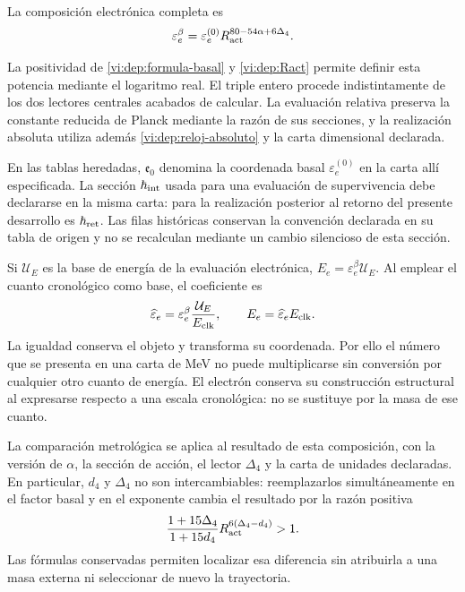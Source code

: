 \begin{definition}
La composición electrónica completa es
\begin{equation}
 \varepsilon_e^\beta
  =\varepsilon_e^{(0)}
      R_{\rm act}^{80-54\alpha+6\Delta_4}.
 \label{vi:dep:electron-beta}
\end{equation}
\end{definition}
La positividad de \eqref{vi:dep:formula-basal} y
\eqref{vi:dep:Ract} permite definir esta potencia mediante el
logaritmo real. El triple entero procede indistintamente de los dos
lectores centrales acabados de calcular. La evaluación relativa
preserva la constante reducida de Planck mediante la razón de sus
secciones, y la realización absoluta utiliza además
\eqref{vi:dep:reloj-absoluto} y la carta dimensional declarada.

En las tablas heredadas, \(\mathfrak e_0\) denomina la
coordenada basal \(\varepsilon_e^{(0)}\) en la carta allí
especificada. La sección \(\hbar_{\rm int}\) usada para una
evaluación de supervivencia debe declararse en la misma carta:
para la realización posterior al retorno del presente desarrollo
es \(\hbar_{\rm ret}\). Las filas históricas conservan la
convención declarada en su tabla de origen y no se recalculan mediante un
cambio silencioso de esta sección.

Si \(\mathcal U_E\) es la base de energía de la evaluación
electrónica, \(E_e=\varepsilon_e^\beta\mathcal U_E\). Al emplear
el cuanto cronológico como base, el coeficiente es
\[
 \widehat\varepsilon_e
   =\varepsilon_e^\beta\frac{\mathcal U_E}{E_{\rm clk}},
 \qquad E_e=\widehat\varepsilon_e E_{\rm clk}.
\]
La igualdad conserva el objeto y transforma su coordenada. Por ello
el número que se presenta en una carta de MeV no puede multiplicarse
sin conversión por cualquier otro cuanto de energía. El electrón
conserva su construcción estructural al expresarse respecto a una
escala cronológica: no se sustituye por la masa de ese cuanto.

La comparación metrológica se aplica al resultado de esta composición,
con la versión de \(\alpha\), la sección de acción, el lector
\(\Delta_4\) y la carta de unidades declaradas. En particular,
\(d_4\) y \(\Delta_4\) no son intercambiables: reemplazarlos
simultáneamente en el factor basal y en el exponente cambia el
resultado por la razón positiva
\[
 \frac{1+15\Delta_4}{1+15d_4}
 R_{\rm act}^{6(\Delta_4-d_4)}>1.
\]
Las fórmulas conservadas permiten localizar esa diferencia sin
atribuirla a una masa externa ni seleccionar de nuevo la trayectoria.
